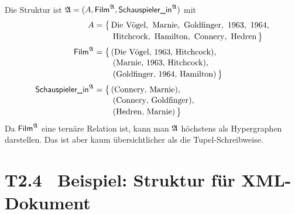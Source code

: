 \documentclass[fontsize=11pt, twoside=false, numbers=autoenddot]{scrbook}
\begin{document}
Die Struktur ist $\mathfrak{A} = (A, \textsf{Film}^\mathfrak{A}, \textsf{Schauspieler\_in}^\mathfrak{A})$ mit
%
\begin{align*}
  A                              & = \big\{\,\text{Die Vögel},~ \text{Marnie},~ \text{Goldfinger},~ 1963,~ 1964,                \\[-2pt]
                                 & \hspace*{7.5mm}\,\text{Hitchcock},~ \text{Hamilton},~ \text{Connery},~ \text{Hedren}\,\big\} \\[2pt]
  \textsf{Film}^\mathfrak{A}             & = \big\{\,(\text{Die Vögel},\, \text{1963},\, \text{Hitchcock}),                             \\[-2pt]
                                 & \hspace*{7.5mm}\,(\text{Marnie},\, \text{1963},\, \text{Hitchcock}),                         \\[-2pt]
                                 & \hspace*{7.5mm}\,(\text{Goldfinger},\, \text{1964},\, \text{Hamilton})\,\big\}               \\[2pt]
  \textsf{Schauspieler\_in}^\mathfrak{A} & = \big\{\,(\text{Connery},\, \text{Marnie}),                                                 \\[-2pt]
                                 & \hspace*{7.5mm}\,(\text{Connery},\, \text{Goldfinger}),                                      \\[-2pt]
                                 & \hspace*{7.5mm}\,(\text{Hedren},\, \text{Marnie})\,\big\}
\end{align*}
%
Da $\textsf{Film}^\mathfrak{A}$ eine ternäre Relation ist, kann man $\mathfrak{A}$ höchstens als Hypergraphen darstellen.
Das ist aber kaum übersichtlicher als die Tupel-Schreibweise.

\section*{T2.4~ Beispiel: Struktur für XML-Dokument}
\end{document}
